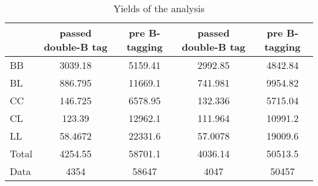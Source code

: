 \documentclass[10pt]{article}
\begin{document}
\begin{table}[htbp]
\begin{center}
\begin{tabular}{|l|S|S|S|S|}
\hline 
 & {passed double-B tag} & {pre B-tagging} & {passed double-B tag} & {pre B-tagging}\\
\hline 
  BB   & 3039.18  & 5159.41  & 2992.85  & 4842.84  \\ 
  BL   & 886.795  & 11669.1  & 741.981  & 9954.82  \\ 
  CC   & 146.725  & 6578.95  & 132.336  & 5715.04  \\ 
  CL   & 123.39  & 12962.1  & 111.964  & 10991.2  \\ 
  LL   & 58.4672  & 22331.6  & 57.0078  & 19009.6  \\ 
\hline 
  Total  & 4254.55  & 58701.1  & 4036.14  & 50513.5  \\ 
\hline 
  Data   & 4354 & 58647 & 4047 & 50457 \\ 
\hline 
\end{tabular} 
\caption{Yields of the analysis} 
\end{center} 
\end{table} 
\end{document}
